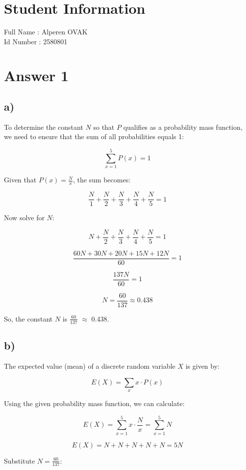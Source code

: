 \documentclass[12pt]{article}
\begin{document}
\section*{Student Information } 
Full Name :  Alperen OVAK\\
Id Number :  2580801\\

\section*{Answer 1}

\subsection*{a)}
To determine the constant $N$ so that $P$ qualifies as a probability mass function, we need to ensure that the sum of all probabilities equals 1:

\[
\sum_{x=1}^{5} P(x) = 1
\]

Given that $P(x) = \frac{N}{x}$, the sum becomes:

\[
\frac{N}{1} + \frac{N}{2} + \frac{N}{3} + \frac{N}{4} + \frac{N}{5} = 1
\]

Now solve for $N$:

\[
N + \frac{N}{2} + \frac{N}{3} + \frac{N}{4} + \frac{N}{5} = 1
\]

\[
\frac{60N + 30N + 20N + 15N + 12N}{60} = 1
\]

\[
\frac{137N}{60} = 1
\]

\[
N = \frac{60}{137} \approx 0.438
\]

So, the constant $N$ is $\frac{60}{137}$ $\approx$ 0.438.

\subsection*{b)}
The expected value (mean) of a discrete random variable $X$ is given by:

\[
E(X) = \sum_{x} x \cdot P(x)
\]

Using the given probability mass function, we can calculate:

\[
E(X) = \sum_{x=1}^{5} x \cdot \frac{N}{x} = \sum_{x=1}^{5} N
\]

\[
E(X) = N + N + N + N + N = 5N
\]

Substitute $N = \frac{60}{137} $:
\end{document}
